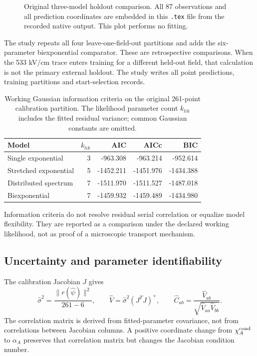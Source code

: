 \documentclass[11pt,a4paper]{article}
\newcommand{\code}[1]{\texttt{\detokenize{#1}}}
\begin{document}
\begin{figure}[htbp]
\caption{Original three-model holdout comparison. All 87 observations and all prediction coordinates are embedded in this \texttt{.tex} file from the recorded native output. This plot performs no fitting.}
\label{fig:holdout}
\end{figure}

The \code{review} study repeats all four leave-one-field-out partitions and adds the six-parameter biexponential comparator. These are retrospective comparisons. When the 533 kV/cm trace enters training for a different held-out field, that calculation is not the primary external holdout. The study writes all point predictions, training partitions and start-selection records.

\begin{table}[htbp]\centering\small
\caption{Working Gaussian information criteria on the original 261-point calibration partition. The likelihood parameter count $k_{lik}$ includes the fitted residual variance; common Gaussian constants are omitted.}
\label{tab:criteria}
\begin{tabular}{lrrrr}
\toprule
Model & $k_{lik}$ & AIC & AICc & BIC \\
\midrule
Single exponential & 3 & -963.308 & -963.214 & -952.614 \\
Stretched exponential & 5 & -1452.211 & -1451.976 & -1434.388 \\
Distributed spectrum & 7 & -1511.970 & -1511.527 & -1487.018 \\
Biexponential & 7 & -1459.932 & -1459.489 & -1434.980 \\
\bottomrule
\end{tabular}
\end{table}

Information criteria do not resolve residual serial correlation or equalize model flexibility. They are reported as a comparison under the declared working likelihood, not as proof of a microscopic transport mechanism.

\subsection{Uncertainty and parameter identifiability}

The calibration Jacobian $J$ gives
\begin{equation}
 \widehat\sigma^2=\frac{\lVert r(\widehat\psi)\rVert^2}{261-6},\qquad
 \widehat V=\widehat\sigma^2(J^TJ)^+,\qquad
 \widehat C_{ab}=\frac{\widehat V_{ab}}{\sqrt{\widehat V_{aa}\widehat V_{bb}}}.
\end{equation}
The correlation matrix is derived from fitted-parameter covariance, not from correlations between Jacobian columns. A positive coordinate change from $\chi_A^{\rm cond}$ to $\alpha_A$ preserves that correlation matrix but changes the Jacobian condition number.
\end{document}
